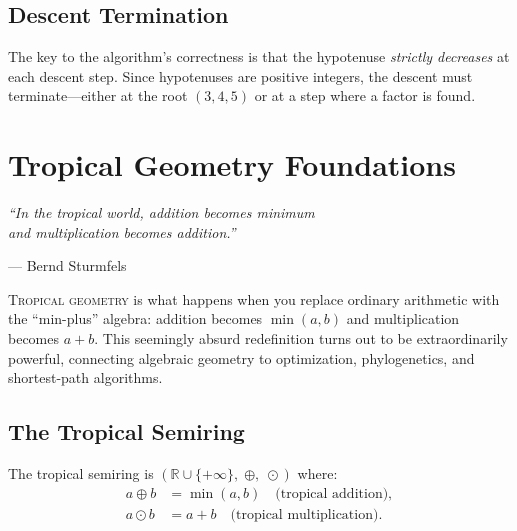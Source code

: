 \documentclass[11pt,twoside,openright]{book}
\theoremstyle{definition}
\newcommand{\R}{\mathbb{R}}
\begin{document}
\section{Descent Termination}

The key to the algorithm's correctness is that the hypotenuse
\emph{strictly decreases} at each descent step. Since hypotenuses are
positive integers, the descent must terminate---either at the root
$(3,4,5)$ or at a step where a factor is found.

\begin{center}
\end{center}

\chapter{Tropical Geometry Foundations}
\label{ch:tropical}

\epigraph{\itshape ``In the tropical world, addition becomes minimum\\
and multiplication becomes addition.''}
{--- Bernd Sturmfels}

\lettrine[lines=3]{T}{ropical geometry} is what happens when you replace
ordinary arithmetic with the ``min-plus'' algebra: addition becomes
$\min(a,b)$ and multiplication becomes $a + b$. This seemingly absurd
redefinition turns out to be extraordinarily powerful, connecting
algebraic geometry to optimization, phylogenetics, and shortest-path
algorithms.

\section{The Tropical Semiring}

The tropical semiring is $(\R \cup \{+\infty\},\; \oplus,\; \odot)$ where:
\begin{align*}
a \oplus b &= \min(a, b) \quad \text{(tropical addition)},\\
a \odot b &= a + b \quad \text{(tropical multiplication)}.
\end{align*}
\end{document}
